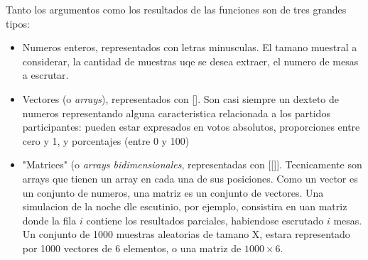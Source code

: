 \documentclass[12pt, a4paper]{article}
\begin{document}
Tanto los argumentos como los resultados de las funciones son de tres grandes tipos:

\begin{center}
  \begin{itemize}
  \item Numeros enteros, representados con letras minusculas. El tamano muestral a considerar, la cantidad de muestras uqe se desea extraer, el numero de mesas a escrutar.
\item Vectores (o \textit{arrays}), representados con []. Son casi siempre un dexteto de numeros representando alguna caracteristica relacionada a los partidos participantes: pueden estar expresados en votos absolutos, proporciones entre cero y 1, y porcentajes (entre 0 y 100)

\item "Matrices" (o \textit{arrays bidimensionales}, representadas con [[]]. Tecnicamente son arrays que tienen un array en cada una de sus posiciones. Como un vector es un conjunto de numeros, una matriz es un conjunto de vectores. Una simulacion de la noche dle escutinio, por ejemplo, consistira en uan matriz donde la fila $i$ contiene los resultados parciales, habiendose escrutado $i$ mesas. Un conjunto de 1000 muestras aleatorias de tamano X, estara representado por 1000 vectores de 6 elementos, o una matriz de $ 1000 \times 6 $.
\end{itemize}
\end{center}


\restoregeometry
\end{document}
